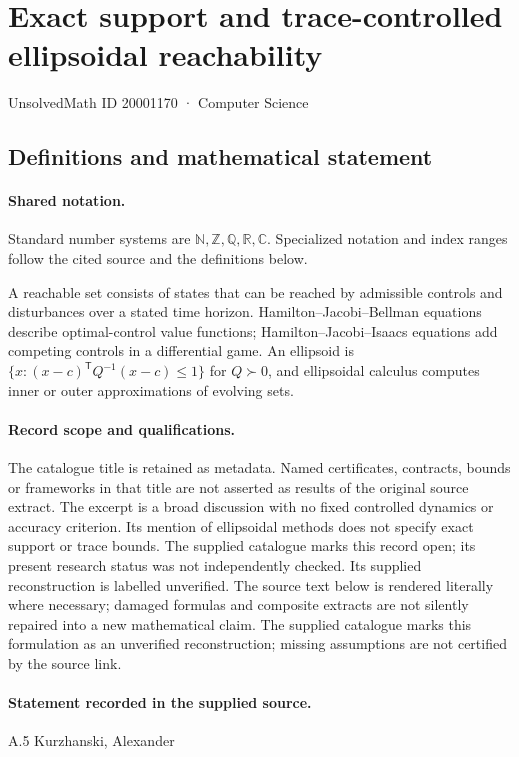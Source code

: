 \documentclass[11pt]{article}
\begin{document}
\setcounter{section}{20001169}
\section{Exact support and trace-controlled ellipsoidal reachability}\label{20001170}
{\small\sffamily UnsolvedMath ID 20001170 · Computer Science}
\subsection{Definitions and mathematical statement}

\paragraph{Shared notation.}Standard number systems are $\mathbb N,\mathbb Z,\mathbb Q,\mathbb R,\mathbb C$. Specialized notation and index ranges follow the cited source and the definitions below.


A reachable set consists of states that can be reached by admissible controls and disturbances over a stated time horizon. Hamilton--Jacobi--Bellman equations describe optimal-control value functions; Hamilton--Jacobi--Isaacs equations add competing controls in a differential game. An ellipsoid is $\{x:(x-c)^{\mathsf T}Q^{-1}(x-c)\leq1\}$ for $Q\succ0$, and ellipsoidal calculus computes inner or outer approximations of evolving sets.
\paragraph{Record scope and qualifications.}
The catalogue title is retained as metadata. Named certificates, contracts, bounds or frameworks in that title are not asserted as results of the original source extract.
The excerpt is a broad discussion with no fixed controlled dynamics or accuracy criterion. Its mention of ellipsoidal methods does not specify exact support or trace bounds. The supplied catalogue marks this record open; its present research status was not independently checked. Its supplied reconstruction is labelled unverified.
The source text below is rendered literally where necessary; damaged formulas and composite extracts are not silently repaired into a new mathematical claim.
The supplied catalogue marks this formulation as an unverified reconstruction; missing assumptions are not certified by the source link.
\paragraph{Statement recorded in the supplied source.}
A.5 Kurzhanski, Alexander
\end{document}
